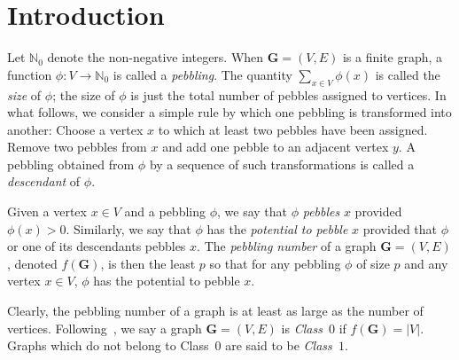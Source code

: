 \documentclass{amsart}
\theoremstyle{remark}
\newcommand{\GVE}{\mathbf{G}=(V,E)}
\newcommand{\bfG}{\mathbf{G}}
\begin{document}
\section{Introduction}\label{s:intro}
Let $\mathbb{N}_0$ denote the non-negative integers.
When $\GVE$ is a finite graph, a function $\phi:V\rightarrow\mathbb{N}_0$
is called a \textit{pebbling}.  The quantity $\sum_{x\in V}\phi(x)$ is 
called the \textit{size} of $\phi$; the size of $\phi$ is just the total 
number of pebbles assigned to vertices.  In what follows, we 
consider a simple rule by which one pebbling is transformed into 
another: \quad  Choose a vertex $x$ to 
which at least two pebbles have been assigned.  Remove two 
pebbles from $x$ and add one pebble to an adjacent vertex $y$.
A pebbling obtained from $\phi$ by a sequence of such transformations 
is called a \textit{descendant} of $\phi$.

Given a vertex $x\in V$ and a pebbling $\phi$, we
say that $\phi$ \textit{pebbles} $x$ provided $\phi(x)>0$. Similarly, we
say that $\phi$ has the \textit{potential to pebble} $x$ provided
that $\phi$ or one of its descendants pebbles $x$.
The \textit{pebbling number} of a graph $\GVE$,
denoted $f(\bfG)$, is then the least $p$ so that for any pebbling 
$\phi$ of size $p$ and any vertex $x\in V$, $\phi$ has the 
potential to pebble $x$.

Clearly, the pebbling number of a graph is at least as large
as the number of vertices.  Following~\cite{CHH},
we say a graph $\GVE$ is \textit{Class~$0$} if
$f(\bfG)=|V|$.  Graphs which do not belong to
Class~$0$ are said to be \textit{Class~$1$}.
\end{document}
